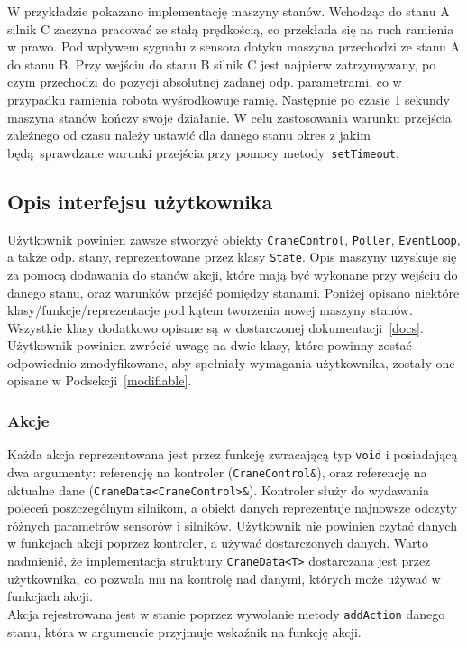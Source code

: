 \documentclass{article}
\begin{document}
W przykładzie pokazano implementację maszyny stanów. Wchodząc do stanu A silnik
C zaczyna pracować ze stałą prędkością, co przekłada się na ruch ramienia w
prawo. Pod wpływem sygnału z sensora dotyku maszyna przechodzi ze stanu A do
stanu B. Przy wejściu do stanu B silnik C jest najpierw zatrzymywany, po czym
przechodzi do pozycji absolutnej zadanej odp. parametrami, co w przypadku
ramienia robota wyśrodkowuje ramię. Następnie po czasie 1 sekundy maszyna stanów
kończy swoje działanie. W celu zastosowania warunku przejścia zależnego od czasu
należy ustawić dla danego stanu okres z jakim będą sprawdzane warunki przejścia
przy pomocy metody~\texttt{setTimeout}. \\
\subsection{Opis interfejsu użytkownika}
Użytkownik powinien zawsze stworzyć obiekty \texttt{CraneControl}, \texttt{Poller},
\texttt{EventLoop}, a także odp. stany, reprezentowane przez klasy
\texttt{State}. Opis maszyny uzyskuje się za pomocą dodawania do stanów akcji,
które mają być wykonane przy wejściu do danego stanu, oraz warunków przejść
pomiędzy stanami. Poniżej opisano niektóre klasy/funkcje/reprezentacje pod kątem
tworzenia nowej maszyny stanów. Wszystkie klasy dodatkowo opisane są w
dostarczonej dokumentacji~\ref{docs}. Użytkownik powinien zwrócić uwagę na dwie
klasy, które powinny zostać odpowiednio zmodyfikowane, aby spełniały wymagania
użytkownika, zostały one opisane w Podsekcji~\ref{modifiable}.
\subsubsection*{Akcje}
Każda akcja reprezentowana jest przez funkcję zwracającą typ \texttt{void} i posiadającą dwa argumenty:
referencję na kontroler (\texttt{CraneControl\&}), oraz referencję na aktualne dane
(\texttt{CraneData<CraneControl>\&}). Kontroler służy do wydawania poleceń poszczególnym silnikom, a
obiekt danych reprezentuje najnowsze odczyty różnych parametrów sensorów i
silników. Użytkownik nie powinien czytać danych w funkcjach akcji poprzez
kontroler, a używać dostarczonych danych. Warto nadmienić, że
implementacja struktury \texttt{CraneData<T>} dostarczana jest przez użytkownika, co
pozwala mu na kontrolę nad danymi, których może używać w funkcjach akcji.\\
Akcja rejestrowana jest w stanie poprzez wywołanie metody \texttt{addAction}
danego stanu, która w argumencie przyjmuje wskaźnik na funkcję akcji.
\end{document}
